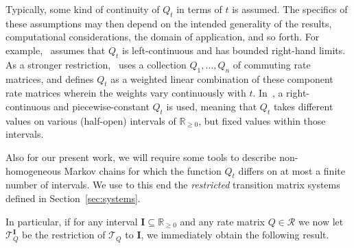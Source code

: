 \documentclass[10pt,a4paper]{paper}
\theoremstyle{definition}
\newcommand{\reals}{\mathbb{R}}
\newcommand{\realsnonneg}{\reals_{\geq 0}}
\begin{document}
Typically, some kind of continuity of $Q_t$ in terms of $t$ is assumed. The specifics of these assumptions may then depend on the intended generality of the results, computational considerations, the domain of application, and so forth. For example,~\cite{aalen1978empirical} assumes that $Q_t$ is left-continuous and has bounded right-hand limits. As a stronger restriction,~\cite{johnson1989nonhomogeneous} uses a collection $Q_1,\ldots,Q_n$ of commuting rate matrices, and defines $Q_t$ as a weighted linear combination of these component rate matrices wherein the weights vary continuously with $t$. In~\cite{rindos1995exact}, a right-continuous and piecewise-constant $Q_t$ is used, meaning that $Q_t$ takes different values on various (half-open) intervals of $\realsnonneg$, but fixed values within those intervals.

Also for our present work, we will require some tools to describe non-homogeneous Markov chains for which the function $Q_t$ differs on at most a finite number of intervals. We use to this end the \emph{restricted} transition matrix systems defined in Section~\ref{sec:systems}.





In particular, if for any interval $\mathbf{I}\subseteq\realsnonneg$ and any rate matrix $Q\in\mathcal{R}$ we now let $\mathcal{T}_Q^{\mathbf{I}}$ be the restriction of $\mathcal{T}_Q$ to $\mathbf{I}$, we immediately obtain the following result.
\end{document}
